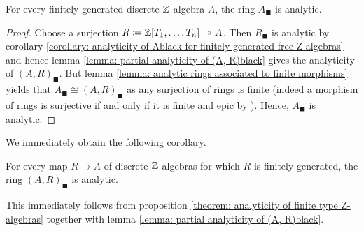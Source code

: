 \begin{theorem}
	\label{theorem: analyticity of finite type Z-algebras}
	
	For every finitely generated discrete ${\mathbb{Z}}$-algebra $A$, the ring $A_\blacksquare$ is analytic.
\end{theorem}
\begin{proof}
	Choose a surjection $R\coloneqq {\mathbb{Z}}[T_1, \dots, T_n]\twoheadrightarrow A$. Then $R_\blacksquare$ is analytic by corollary \ref{corollary: analyticity of Ablack for finitely generated free Z-algebras} and hence lemma \ref{lemma: partial analyticity of (A, R)black} gives the analyticity of $(A, R)_\blacksquare$. But lemma \ref{lemma: analytic rings associated to finite morphisms} yields that $A_\blacksquare \cong (A, R)_\blacksquare$ as any surjection of rings is finite (indeed a morphism of rings is surjective if and only if it is finite and epic by \cite[\href{https://stacks.math.columbia.edu/tag/04VT}{Tag 04VT}]{stacks-project}). Hence, $A_\blacksquare$ is analytic.
\end{proof}

We immediately obtain the following corollary.
\begin{corollary}
	\label{corollary: analyticity of (A, R)black for finitely generated R}
	
	For every map $R\to A$ of discrete ${\mathbb{Z}}$-algebras for which $R$ is finitely generated, the ring $(A, R)_\blacksquare$ is analytic.
\end{corollary}
\begin{shortproof}
	This immediately follows from proposition \ref{theorem: analyticity of finite type Z-algebras} together with lemma \ref{lemma: partial analyticity of (A, R)black}.
\end{shortproof}


